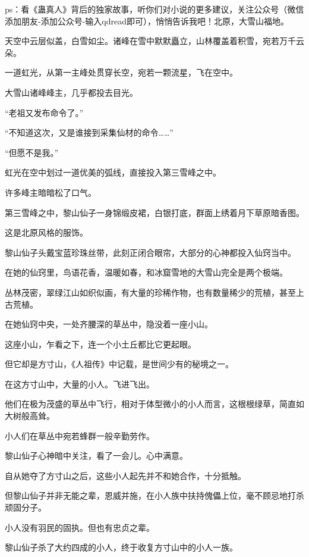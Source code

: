 
\begin{this_body}

ps：看《蛊真人》背后的独家故事，听你们对小说的更多建议，关注公众号（微信添加朋友-添加公众号-输入qdread即可），悄悄告诉我吧！北原，大雪山福地。

天空中云层似盖，白雪如尘。诸峰在雪中默默矗立，山林覆盖着积雪，宛若万千云朵。

一道虹光，从第一主峰处贯穿长空，宛若一颗流星，飞在空中。

大雪山诸峰峰主，几乎都投去目光。

“老祖又发布命令了。”

“不知道这次，又是谁接到采集仙材的命令……”

“但愿不是我。”

虹光在空中划过一道优美的弧线，直接投入第三雪峰之中。

许多峰主暗暗松了口气。

第三雪峰之中，黎山仙子一身锦缎皮裙，白银打底，群面上绣着月下草原暗香图。

这是北原风格的服饰。

黎山仙子头戴宝蓝珍珠丝带，此刻正闭合眼帘，大部分的心神都投入仙窍当中。

在她的仙窍里，鸟语花香，温暖如春，和冰窟雪地的大雪山完全是两个极端。

丛林茂密，翠绿江山如织似画，有大量的珍稀作物，也有数量稀少的荒植，甚至上古荒植。

在她仙窍中央，一处齐腰深的草丛中，隐没着一座小山。

这座小山，乍看之下，连一个小土丘都比它更起眼。

但它却是方寸山，《人祖传》中记载，是世间少有的秘境之一。

在这方寸山中，大量的小人。飞进飞出。

他们在极为茂盛的草丛中飞行，相对于体型微小的小人而言，这根根绿草，简直如大树般高耸。

小人们在草丛中宛若蜂群一般辛勤劳作。

黎山仙子心神暗中关注，看了一会儿。心中满意。

自从她夺了方寸山之后，这些小人起先并不和她合作，十分抵触。

但黎山仙子并非无能之辈，恩威并施，在小人族中扶持傀儡上位，毫不顾忌地打杀顽固分子。

小人没有羽民的固执。但也有忠贞之辈。

黎山仙子杀了大约四成的小人，终于收复方寸山中的小人一族。


\end{this_body}
